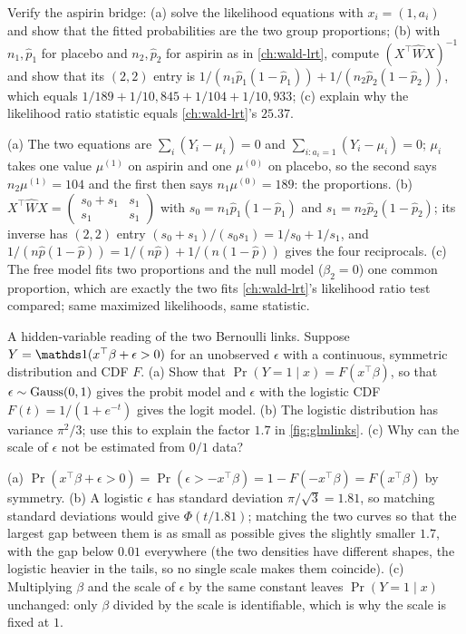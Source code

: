 \begin{exercise}
\label{ex:glm-aspirin}
Verify the aspirin bridge: (a) solve the likelihood equations with $x_i = (1, a_i)$ and show that the fitted probabilities are the two group proportions; (b) with $n_1, \hat{p}_1$ for placebo and $n_2, \hat{p}_2$ for aspirin as in \cref{ch:wald-lrt}, compute $(X^\top\hat{W}X)^{-1}$ and show that its $(2, 2)$ entry is $1/(n_1\hat{p}_1(1 - \hat{p}_1)) + 1/(n_2\hat{p}_2(1 - \hat{p}_2))$, which equals $1/189 + 1/10{,}845 + 1/104 + 1/10{,}933$; (c) explain why the likelihood ratio statistic equals \cref{ch:wald-lrt}'s $25.37$.
\end{exercise}
\begin{solution}
(a) The two equations are $\sum_i(Y_i - \mu_i) = 0$ and $\sum_{i: a_i = 1}(Y_i - \mu_i) = 0$; $\mu_i$ takes one value $\mu^{(1)}$ on aspirin and one $\mu^{(0)}$ on placebo, so the second says $n_2\mu^{(1)} = 104$ and the first then says $n_1\mu^{(0)} = 189$: the proportions. (b) $X^\top\hat{W}X = \begin{pmatrix} s_0 + s_1 & s_1 \\ s_1 & s_1\end{pmatrix}$ with $s_0 = n_1\hat{p}_1(1 - \hat{p}_1)$ and $s_1 = n_2\hat{p}_2(1 - \hat{p}_2)$; its inverse has $(2, 2)$ entry $(s_0 + s_1)/(s_0s_1) = 1/s_0 + 1/s_1$, and $1/(n\hat{p}(1 - \hat{p})) = 1/(n\hat{p}) + 1/(n(1 - \hat{p}))$ gives the four reciprocals. (c) The free model fits two proportions and the null model ($\beta_2 = 0$) one common proportion, which are exactly the two fits \cref{ch:wald-lrt}'s likelihood ratio test compared; same maximized likelihoods, same statistic.
\end{solution}

\begin{exercise}
\label{ex:glm-latent}
A hidden-variable reading of the two Bernoulli links. Suppose $Y = \ind(x^\top\beta + \epsilon > 0)$ for an unobserved $\epsilon$ with a continuous, symmetric distribution and CDF $F$. (a) Show that $\Pr(Y = 1 \mid x) = F(x^\top\beta)$, so that $\epsilon \sim \text{Gauss}(0, 1)$ gives the probit model and $\epsilon$ with the logistic CDF $F(t) = 1/(1 + e^{-t})$ gives the logit model. (b) The logistic distribution has variance $\pi^2/3$; use this to explain the factor $1.7$ in \cref{fig:glmlinks}. (c) Why can the scale of $\epsilon$ not be estimated from $0/1$ data?
\end{exercise}
\begin{solution}
(a) $\Pr(x^\top\beta + \epsilon > 0) = \Pr(\epsilon > -x^\top\beta) = 1 - F(-x^\top\beta) = F(x^\top\beta)$ by symmetry. (b) A logistic $\epsilon$ has standard deviation $\pi/\sqrt{3} = 1.81$, so matching standard deviations would give $\Phi(t/1.81)$; matching the two curves so that the largest gap between them is as small as possible gives the slightly smaller $1.7$, with the gap below $0.01$ everywhere (the two densities have different shapes, the logistic heavier in the tails, so no single scale makes them coincide). (c) Multiplying $\beta$ and the scale of $\epsilon$ by the same constant leaves $\Pr(Y = 1 \mid x)$ unchanged: only $\beta$ divided by the scale is identifiable, which is why the scale is fixed at $1$.
\end{solution}

